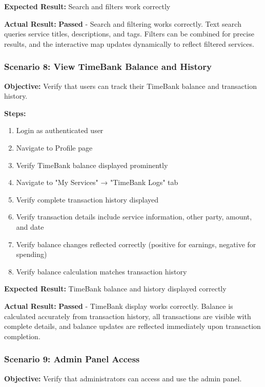 \documentclass[12pt,a4paper]{report}
\begin{document}
\textbf{Expected Result:} Search and filters work correctly

\textbf{Actual Result:} \textbf{Passed} - Search and filtering works correctly. Text search queries service titles, descriptions, and tags. Filters can be combined for precise results, and the interactive map updates dynamically to reflect filtered services.

\subsubsection{Scenario 8: View TimeBank Balance and History}

\textbf{Objective:} Verify that users can track their TimeBank balance and transaction history.

\textbf{Steps:}
\begin{enumerate}
    \item Login as authenticated user
    \item Navigate to Profile page
    \item Verify TimeBank balance displayed prominently
    \item Navigate to "My Services" → "TimeBank Logs" tab
    \item Verify complete transaction history displayed
    \item Verify transaction details include service information, other party, amount, and date
    \item Verify balance changes reflected correctly (positive for earnings, negative for spending)
    \item Verify balance calculation matches transaction history
\end{enumerate}

\textbf{Expected Result:} TimeBank balance and history displayed correctly

\textbf{Actual Result:} \textbf{Passed} - TimeBank display works correctly. Balance is calculated accurately from transaction history, all transactions are visible with complete details, and balance updates are reflected immediately upon transaction completion.

\subsubsection{Scenario 9: Admin Panel Access}

\textbf{Objective:} Verify that administrators can access and use the admin panel.
\end{document}
